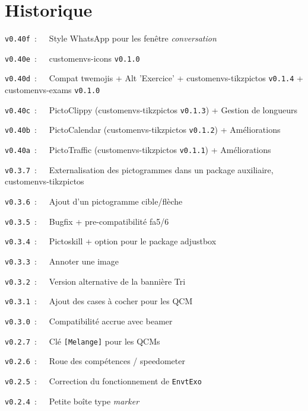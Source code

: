 \documentclass[french,11pt,a4paper]{article}
\begin{document}

\hypertarget{matoc}{}

\tableofcontents

\vspace*{5mm}

\pagebreak

\section{Historique}

\verb|v0.40f|~:~~~Style \textsf{WhatsApp} pour les fenêtre \textit{conversation}

\verb|v0.40e|~:~~~\textsf{customenvs-icons} \texttt{v0.1.0}

\verb|v0.40d|~:~~~Compat \textsf{twemojis} + \textsf{Alt} 'Exercice' + \textsf{customenvs-tikzpictos} \texttt{v0.1.4} + \textsf{customenvs-exams} \texttt{v0.1.0}

\verb|v0.40c|~:~~~PictoClippy (\textsf{customenvs-tikzpictos} \texttt{v0.1.3}) + Gestion de longueurs

\verb|v0.40b|~:~~~PictoCalendar (\textsf{customenvs-tikzpictos} \texttt{v0.1.2}) + Améliorations

\verb|v0.40a|~:~~~PictoTraffic (\textsf{customenvs-tikzpictos} \texttt{v0.1.1}) + Améliorations

\verb|v0.3.7|~:~~~Externalisation des pictogrammes dans un package auxiliaire, \textsf{customenvs-tikzpictos}

\verb|v0.3.6|~:~~~Ajout d'un pictogramme \textsf{cible/flèche}

\verb|v0.3.5|~:~~~Bugfix + pre-compatibilité \textsf{fa5/6}

\verb|v0.3.4|~:~~~Pictoskill + option pour le package \textsf{adjustbox}

\verb|v0.3.3|~:~~~Annoter une image

\verb|v0.3.2|~:~~~Version alternative de la bannière \textsf{Tri}

\verb|v0.3.1|~:~~~Ajout des cases à cocher pour les \textsf{QCM}

\verb|v0.3.0|~:~~~Compatibilité accrue avec \textsf{beamer}

\verb|v0.2.7|~:~~~Clé \texttt{[Melange]} pour les QCMs

\verb|v0.2.6|~:~~~Roue des compétences / speedometer

\verb|v0.2.5|~:~~~Correction du fonctionnement de \texttt{EnvtExo}

\verb|v0.2.4|~:~~~Petite boîte type \textit{marker}
\end{document}
